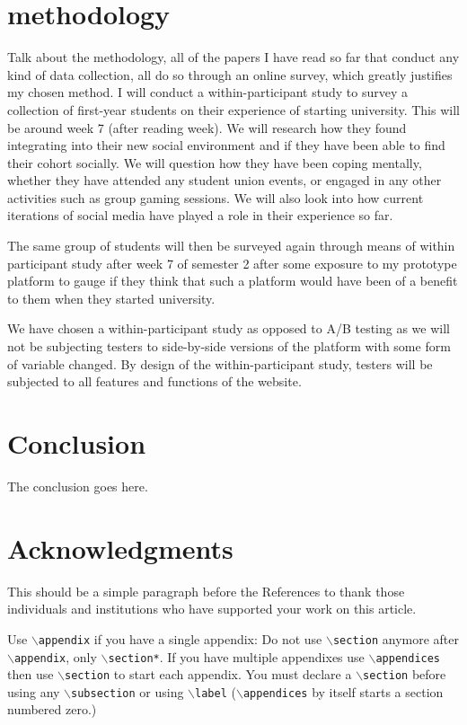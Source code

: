 \documentclass[lettersize,journal]{IEEEtran}
\begin{document}
\section{methodology}
    Talk about the methodology, all of the papers I have read so far that conduct
    any kind of data collection, all do so through an online survey, which greatly
    justifies my chosen method. I will conduct a within-participant study to survey
    a collection of first-year students on their experience of starting university.
    This will be around week 7 (after reading week). We will research how they
    found integrating into their new social environment and if they have been able to
    find their cohort socially. We will question how they have been coping mentally,
    whether they have attended any student union events, or engaged in any other
    activities such as group gaming sessions. We will also look into how current
    iterations of social media have played a role in their experience so far.

    The same group of students will then be surveyed again through means of within
    participant study after week 7 of semester 2 after some exposure to my prototype
    platform to gauge if they think that such a platform would have been of a benefit
    to them when they started university.

    We have chosen a within-participant study as opposed to A/B
    testing as we will not be subjecting testers to side-by-side
    versions of the platform with some form of variable
    changed. By design of the within-participant study,
    testers will be subjected to all features and functions of the
    website.

\section{Conclusion}
    The conclusion goes here.


\section*{Acknowledgments}
    This should be a simple paragraph before the References to thank those individuals and
    institutions who have supported your work on this article.



{
    Use $\backslash${\tt{appendix}} if you have a single appendix:
    Do not use $\backslash${\tt{section}} anymore after $\backslash${\tt{appendix}}, only $\backslash${\tt{section*}}.
    If you have multiple appendixes use $\backslash${\tt{appendices}} then use $\backslash${\tt{section}} to start each appendix.
You must declare a $\backslash${\tt{section}} before using any $\backslash${\tt{subsection}} or using $\backslash${\tt{label}} ($\backslash${\tt{appendices}} by itself
 starts a section numbered zero.)}
\end{document}
